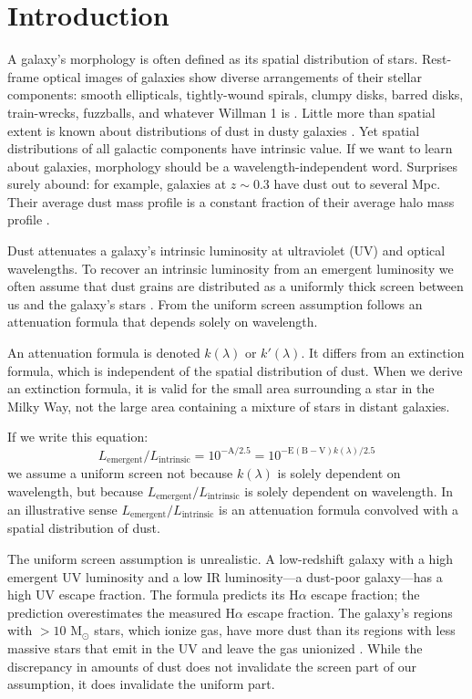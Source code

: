 \documentclass[preprint]{aastex}
\begin{document}
\section{Introduction}

A galaxy's morphology is often defined as its spatial distribution of stars.
Rest-frame optical images of galaxies show diverse arrangements of
their stellar components: smooth ellipticals, tightly-wound spirals, clumpy
disks, barred disks, train-wrecks, fuzzballs, and whatever Willman 1 is
\citep{willman05,willman11}.
Little more than spatial extent is known about distributions of dust in dusty
galaxies
\citep{younger10,diaz10,simpson15}.  Yet spatial distributions of
all galactic components have intrinsic value.  If we want to learn about
galaxies, morphology should be a wavelength-independent word.  Surprises
surely abound: for example, galaxies at $z \sim 0.3$ have dust out to several
Mpc.  Their average dust mass profile is a constant fraction of their average
halo mass profile \citep[][see also \citealt{zaritsky94}]{menard10}.

Dust attenuates a galaxy's intrinsic luminosity at ultraviolet (UV) and optical
wavelengths.  To recover an intrinsic luminosity from an emergent luminosity we
often assume that dust grains
are distributed as a uniformly thick screen between us and the galaxy's stars
\citep{calzetti94}.  From the uniform screen assumption follows an
attenuation formula that depends solely on wavelength.

An attenuation formula is denoted $k(\lambda)$ or $k'(\lambda)$.  It differs
from an extinction formula, which is independent of the spatial distribution
of dust.  When we derive an extinction formula, it is valid for the small area
surrounding a star in the Milky Way, not the large area containing a mixture of
stars in distant galaxies.

If we write this equation:
\begin{equation*}
L_{\mathrm{emergent}}/L_{\mathrm{intrinsic}} = 10^{-\mathrm{A}/2.5} = 10^{-\mathrm{E(B-V)} k(\lambda)/2.5}
\end{equation*}
we assume a uniform screen not because $k(\lambda)$ is solely dependent on
wavelength, but because $L_{\mathrm{emergent}}/L_{\mathrm{intrinsic}}$ is solely
dependent on
wavelength.  In an illustrative sense
$L_{\mathrm{emergent}}/L_{\mathrm{intrinsic}}$
is an attenuation formula convolved with a spatial distribution of dust.

The uniform screen assumption is unrealistic.  A low-redshift galaxy with a
high emergent UV luminosity and a low IR luminosity---a dust-poor
galaxy---has a high UV escape fraction.  The \citet{calzetti00} formula
predicts its H$\alpha$ escape fraction; the prediction
overestimates the measured H$\alpha$ escape fraction.  The galaxy's regions with
$>10$ M$_{\odot}$ stars, which ionize gas, have more dust than its regions
with less massive stars that emit in the UV and leave the gas unionized
\citep{calzetti94,calzetti97b}.  While the discrepancy in amounts of dust does
not invalidate the screen part of our assumption, it does invalidate the
uniform part.
\end{document}
